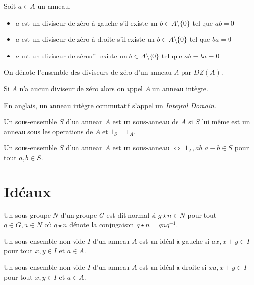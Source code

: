 \begin{defn}
\label{def:alg:ring:intro:div0}
Soit $a\in A$ un anneau.

\begin{itemize}
\item $a$ est un diviseur de zéro à gauche s'il existe un $b\in A\setminus\{0\}$ tel que $ab=0$
\item $a$ est un diviseur de zéro à droite s'il existe un $b\in A\setminus\{0\}$ tel que $ba=0$
\item $a$ est un diviseur de zéros'il existe un $b\in A\setminus\{0\}$ tel que $ab=ba=0$
\end{itemize}

On dénote l'ensemble des diviseurs de zéro d'un anneau $A$ par $DZ(A)$.

Si $A$ n'a aucun diviseur de zéro alors on appel $A$ un anneau intègre.
\end{defn}

\begin{rmrk}
En anglais, un anneau intègre commutatif s'appel un \textit{Integral Domain}.
\end{rmrk}

\begin{defn}
Un sous-ensemble  $S$ d'un anneau $A$ est un sous-anneau de $A$ si $S$ lui même est un anneau sous les operations de $A$ et $1_S=1_A$.
\end{defn}

\begin{thm}
Un sous-ensemble $S$ d'un anneau $A$ est un sous-anneau $\iff$ $1_A,ab, a-b\in S$ pour tout $a,b\in S$.
\end{thm}

\section{Idéaux}
\label{sec:alg:ring:ideal}
\begin{rmrk}
Un sous-groupe $N$ d'un groupe $G$ est dit normal si $g\star n\in N$ pour tout $g\in G,n\in N$ où $g\star n$ dénote la  conjugaison $g\star n=gng^{-1}$.
\end{rmrk}

\begin{defn}
Un sous-ensemble non-vide $I$  d'un anneau $A$ est un idéal à gauche si $ax,x+y\in I$ pour tout $x,y\in I$ et $a\in A$.

Un sous-ensemble non-vide $I$  d'un anneau $A$ est un idéal à droite si $xa,x+y\in I$ pour tout $x,y\in I$ et $a\in A$.
\end{defn}


